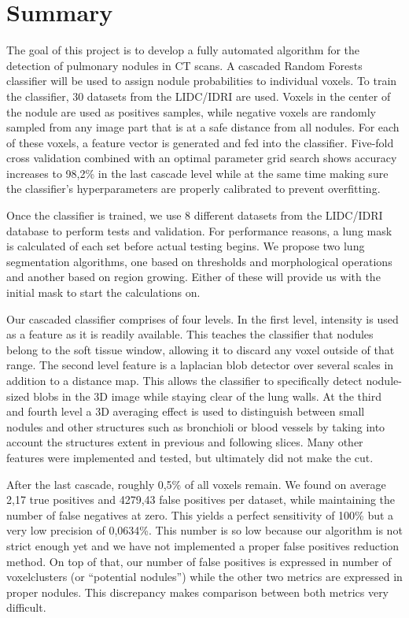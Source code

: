 \section*{Summary} %

The goal of this project is to develop a fully automated algorithm for the
detection of pulmonary nodules in CT scans. A cascaded Random Forests classifier
will be used to assign nodule probabilities to individual voxels. To train the
classifier, 30 datasets from the LIDC/IDRI are used. Voxels in the center of the
nodule are used as positives samples, while negative voxels are randomly sampled
from any image part that is at a safe distance from all nodules. For each of
these voxels, a feature vector is generated and fed into the classifier.
Five-fold cross validation combined with an optimal parameter grid search shows
accuracy increases to 98,2\% in the last cascade level while at the same time
making sure the classifier's hyperparameters are properly calibrated to prevent
overfitting.

Once the classifier is trained, we use 8 different datasets from the LIDC/IDRI
database to perform tests and validation. For performance reasons, a lung mask
is calculated of each set before actual testing begins. We propose two lung
segmentation algorithms, one based on thresholds and morphological operations
and another based on region growing. Either of these will provide us with the
initial mask to start the calculations on.

Our cascaded classifier comprises of four levels. In the first level, intensity
is used as a feature as it is readily available. This teaches the classifier
that nodules belong to the soft tissue window, allowing it to discard any voxel
outside of that range. The second level feature is a laplacian blob detector
over several scales in addition to a distance map. This allows the classifier to
specifically detect nodule-sized blobs in the 3D image while staying clear of
the lung walls. At the third and fourth level a 3D averaging effect is used to
distinguish between small nodules and other structures such as bronchioli or
blood vessels by taking into account the structures extent in previous and
following slices. Many other features were implemented and tested, but
ultimately did not make the cut.

After the last cascade, roughly 0,5\% of all voxels remain. We found on average
2,17 true positives and 4279,43 false positives per dataset, while maintaining
the number of false negatives at zero. This yields a perfect sensitivity of
100\% but a very low precision of 0,0634\%. This number is so low because our
algorithm is not strict enough yet and we have not implemented a proper false
positives reduction method. On top of that, our number of false positives is
expressed in number of voxelclusters (or ``potential nodules'') while the other
two metrics are expressed in proper nodules. This discrepancy makes comparison
between both metrics very difficult.

